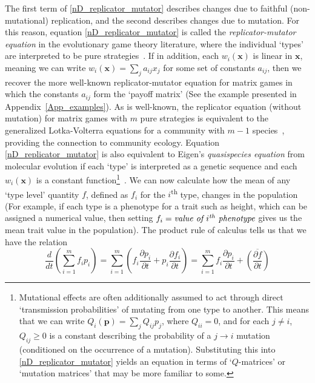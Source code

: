 The first term of \eqref{nD_replicator_mutator} describes changes due to faithful (non-mutational) replication, and the second describes changes due to mutation. For this reason, equation \eqref{nD_replicator_mutator} is called the \emph{replicator-mutator equation} in the evolutionary game theory literature, where the individual `types' are interpreted to be pure strategies~\citep{hofbauer_evolutionary_1998,page_unifying_2002,cressman_replicator_2014}. If in addition, each $w_i(\mathbf{x})$ is linear in $\mathbf{x}$, meaning we can write $w_i(\mathbf{x}) = \sum_{j}a_{ij}x_j$ for some set of constants $a_{ij}$, then we recover the more well-known replicator-mutator equation for matrix games in which the constants $a_{ij}$ form the `payoff matrix' (See the example presented in Appendix~\ref{App_examples}). As is well-known, the replicator equation (without mutation) for matrix games with $m$ pure strategies is equivalent to the generalized Lotka-Volterra equations for a community with $m-1$ species~\citep{hofbauer_evolutionary_1998}, providing the connection to community ecology.  Equation \eqref{nD_replicator_mutator} is also equivalent to Eigen's \emph{quasispecies equation} from molecular evolution if each `type' is interpreted as a genetic sequence and each $w_i(\mathbf{x})$ is a constant function\footnote{Mutational effects are often additionally assumed to act through direct `transmission probabilities' of mutating from one type to another. This means that we can write $Q_i(\mathbf{p}) = \sum_j Q_{ij}p_j$, where $Q_{ii} = 0$, and for each $j \neq i$, $Q_{ij} \geq0$ is a constant describing the probability of a $j \to i$ mutation (conditioned on the occurrence of a mutation). Substituting this into \eqref{nD_replicator_mutator} yields an equation in terms of `$Q$-matrices' or `mutation matrices' that may be more familiar to some.}~\citep{page_unifying_2002}. We can now calculate how the mean of any `type level' quantity $f$, defined as $f_i$ for the $i$\textsuperscript{th} type, changes in the population (For example, if each type is a phenotype for a trait such as height, which can be assigned a numerical value, then setting $f_i = \textit{value of $i\textsuperscript{th}$ phenotype}$ gives us the mean trait value in the population). The product rule of calculus tells us that we have the relation
\begin{equation}
\label{product_rule_for_nD_price}
\frac{d}{dt}\left(\sum\limits_{i=1}^{m}f_ip_i\right) = \sum\limits_{i=1}^{m}\left(f_i\frac{\partial p_i}{\partial t} + p_i\frac{\partial f_i}{\partial t}\right) = \sum\limits_{i=1}^{m}f_i\frac{\partial p_i}{\partial t} + \overline{\left(\frac{\partial f}{\partial t}\right)}
\end{equation}
